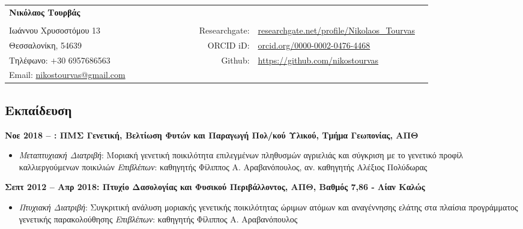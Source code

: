 \documentclass[12pt,]{scrartcl}
\date{}
\begin{document}
\begin{table}[h]
{\def\arraystretch{1.0}\tabcolsep=0pt
\begin{tabular}{p{0.42\linewidth}p{0.05\linewidth}p{0.35\linewidth}}

  \multirow{1}{*}{\LARGE \textbf{Νικόλαος Τουρβάς}} &  &  \\
  
  & & \\
  
  Ιωάννου Χρυσοστόμου 13 & \multicolumn{1}{r}{Researchgate:\;\;} & \multicolumn{1}{l}{\url{researchgate.net/profile/Nikolaos_Tourvas}} \\
  
  Θεσσαλονίκη, 54639 & \multicolumn{1}{r}{ORCID iD:\;\;} & \multicolumn{1}{l}{\href{https://orcid.org/0000-0002-0476-4468}{orcid.org/0000-0002-0476-4468}} \\
  
  Τηλέφωνο: $+$30 6957686563 & \multicolumn{1}{r}{Github:\;\;} & \multicolumn{1}{l}{\href{https://github.com/nikostourvas}{https://github.com/nikostourvas}} \\
  
  Email: {\href{nikostourvas@gmail.com}{nikostourvas@gmail.com}} 
\end{tabular}%
}
\end{table}


\subsection{Εκπαίδευση}\label{Εκπαίδευση}
\vspace{-3mm}

\textbf{Νοε 2018 -- : ΠΜΣ Γενετική, Βελτίωση Φυτών και Παραγωγή Πολ/κού Υλικού, Τμήμα Γεωπονίας, ΑΠΘ}
\begin{itemize}
\setlength\itemsep{-0.5em}
\item \textit{Μεταπτυχιακή Διατριβή}: Μοριακή γενετική ποικιλότητα επιλεγμένων πληθυσμών αγριελιάς και σύγκριση με το γενετικό προφίλ καλλιεργούμενων ποικιλιών
\vspace{2mm}
\newline
\textit{Επιβλέπων}: καθηγητής Φίλιππος Α. Αραβανόπουλος, αν. καθηγητής Αλέξιος Πολύδωρας
\end{itemize}

\textbf{Σεπτ 2012 -- Απρ 2018: Πτυχίο Δασολογίας και Φυσικού Περιβάλλοντος, ΑΠΘ, Βαθμός 7,86 - Λίαν Καλώς}
\begin{itemize}
\setlength\itemsep{-0.5em}
\item \textit{Πτυχιακή Διατριβή}: Συγκριτική ανάλυση μοριακής γενετικής ποικιλότητας
ώριμων ατόμων και αναγέννησης ελάτης στα πλαίσια
προγράμματος γενετικής παρακολούθησης
\vspace{2mm}
\newline
\textit{Επιβλέπων}: καθηγητής Φίλιππος Α. Αραβανόπουλος
\end{itemize}
\end{document}
